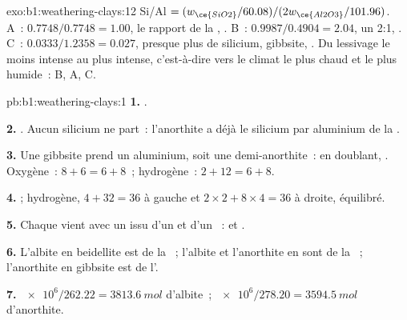 \begin{solution}{exo:b1:weathering-clays:12}
Si/Al $= (w_{\ce{SiO2}}/60.08)/(2w_{\ce{Al2O3}}/101.96)$. A~: $0.7748/0.7748 =
1.00$, le rapport de la , . B~: $0.9987/0.4904 = 2.04$, un
 2:1, . C~: $0.0333/1.2358 = 0.027$, presque plus
de silicium, gibbsite, . Du lessivage le moins intense au plus intense,
c'est-à-dire vers le climat le plus chaud et le plus humide~: B, A, C.
\end{solution}

\begin{solution}{pb:b1:weathering-clays:1}
\textbf{1.} .

\textbf{2.} . Aucun silicium
ne part~: l'anorthite a déjà le silicium par aluminium de la .

\textbf{3.} Une gibbsite prend un aluminium, soit une demi-anorthite~: en doublant,
. Oxygène~:
$8 + 6 = 6 + 8$~; hydrogène~: $2 + 12 = 6 + 8$.

\textbf{4.} ; %
hydrogène, $4 + 32 = 36$ à gauche et $2\times2 + 8\times4 = 36$ à
droite, équilibré.

\textbf{5.} Chaque  vient avec un  issu d'un  et d'un
~:
et .

\textbf{6.} L'albite en beidellite est de la ~; l'albite et l'anorthite en
 sont de la ~; l'anorthite en gibbsite est de l'.

\textbf{7.} $\num{e6}/262.22 = \qty{3813.6}{mol}$ d'albite~;
$\num{e6}/278.20 = \qty{3594.5}{mol}$ d'anorthite.


\end{solution}
